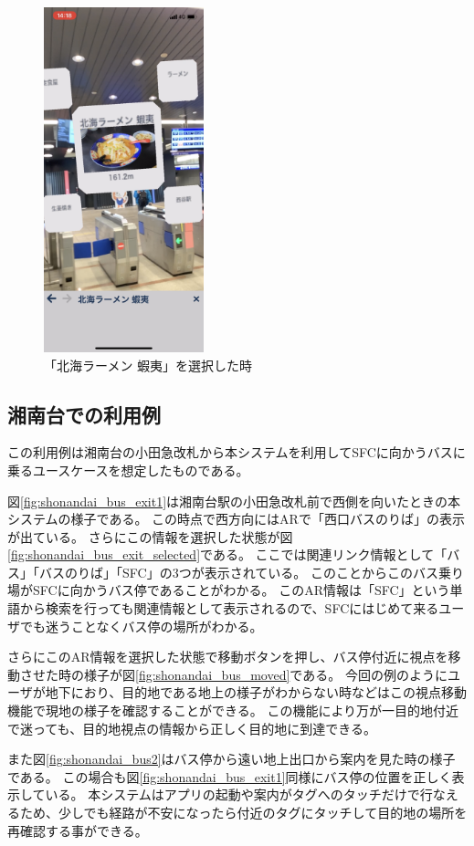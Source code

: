 \begin{figure}[H]
  \centering
  \includegraphics[height=100mm]{images/nishiya_ezo_ar.png}
  \caption{「北海ラーメン 蝦夷」を選択した時} \label{fig:nishiya_ezo_ar}
\end{figure}


\subsection{湘南台での利用例}
この利用例は湘南台の小田急改札から本システムを利用してSFCに向かうバスに乗るユースケースを想定したものである。

図\ref{fig:shonandai_bus_exit1}は湘南台駅の小田急改札前で西側を向いたときの本システムの様子である。
この時点で西方向にはARで「西口バスのりば」の表示が出ている。
さらにこの情報を選択した状態が図\ref{fig:shonandai_bus_exit_selected}である。
ここでは関連リンク情報として「バス」「バスのりば」「SFC」の3つが表示されている。
このことからこのバス乗り場がSFCに向かうバス停であることがわかる。
このAR情報は「SFC」という単語から検索を行っても関連情報として表示されるので、SFCにはじめて来るユーザでも迷うことなくバス停の場所がわかる。

さらにこのAR情報を選択した状態で移動ボタンを押し、バス停付近に視点を移動させた時の様子が図\ref{fig:shonandai_bus_moved}である。
今回の例のようにユーザが地下におり、目的地である地上の様子がわからない時などはこの視点移動機能で現地の様子を確認することができる。
この機能により万が一目的地付近で迷っても、目的地視点の情報から正しく目的地に到達できる。

また図\ref{fig:shonandai_bus2}はバス停から遠い地上出口から案内を見た時の様子である。
この場合も図\ref{fig:shonandai_bus_exit1}同様にバス停の位置を正しく表示している。
本システムはアプリの起動や案内がタグへのタッチだけで行なえるため、少しでも経路が不安になったら付近のタグにタッチして目的地の場所を再確認する事ができる。

